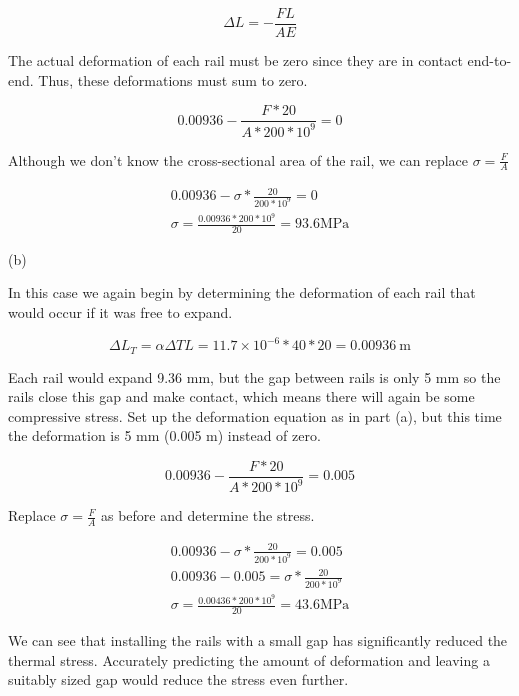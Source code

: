 \documentclass[
  letterpaper,
  DIV=11,
  numbers=noendperiod]{scrreprt}
\begin{document}
\begin{tcolorbox}
\begin{tcolorbox}
\[
\Delta L=-\frac{F L}{A E}
\]

The actual deformation of each rail must be zero since they are in
contact end-to-end. Thus, these deformations must sum to zero.

\[
0.00936-\frac{F * 20}{A * 200 * 10^9}=0
\]

Although we don't know the cross-sectional area of the rail, we can
replace \(\sigma=\frac{F}{A}\)

\[
\begin{gathered}
0.00936-\sigma * \frac{20}{200 * 10^9}=0 \\
\sigma=\frac{0.00936 * 200 * 10^9}{20}=93.6 \mathrm{MPa}
\end{gathered}
\]

(b)

In this case we again begin by determining the deformation of each rail
that would occur if it was free to expand.

\[
\Delta L_T=\alpha \Delta T L=11.7 \times 10^{-6} * 40 * 20=0.00936 \mathrm{~m}
\]

Each rail would expand 9.36 mm, but the gap between rails is only 5 mm
so the rails close this gap and make contact, which means there will
again be some compressive stress. Set up the deformation equation as in
part (a), but this time the deformation is 5 mm (0.005 m) instead of
zero.

\[
0.00936-\frac{F * 20}{A * 200 * 10^9}=0.005
\]

Replace \(\sigma=\frac{F}{A}\) as before and determine the stress.

\[
\begin{gathered}
0.00936-\sigma * \frac{20}{200 * 10^9}=0.005 \\
0.00936-0.005=\sigma * \frac{20}{200 * 10^9} \\
\sigma=\frac{0.00436 * 200 * 10^9}{20}=43.6 \mathrm{MPa}
\end{gathered}
\]

We can see that installing the rails with a small gap has significantly
reduced the thermal stress. Accurately predicting the amount of
deformation and leaving a suitably sized gap would reduce the stress
even further.

\end{tcolorbox}

\end{tcolorbox}
\end{document}
